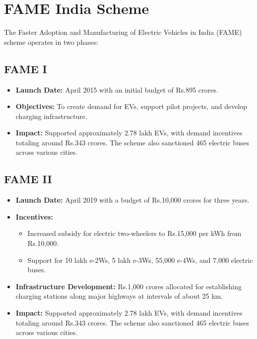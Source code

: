 \documentclass[a4paper,12pt]{report}
\begin{document}
\section{FAME India Scheme}
The Faster Adoption and Manufacturing of Electric Vehicles in India (FAME) scheme operates in two phases:
\subsection{FAME I}
\begin{itemize}
    \item \textbf{Launch Date:}
    April 2015 with an initial budget of Rs.895 crores. 
    
    \item \textbf{Objectives:}
    To create demand for EVs, support pilot projects, and develop charging infrastructure.

    \item \textbf{Impact:}
   Supported approximately 2.78 lakh EVs, with demand incentives totaling around Rs.343 crores. The scheme also sanctioned 465 electric buses across various cities.
\end{itemize} 

\subsection{FAME II}
\begin{itemize}
    \item \textbf{Launch Date:}
    April 2019 with a budget of Rs.10,000 crores for three years.
    
    \item \textbf{Incentives:}
    \begin{itemize}
        \item Increased subsidy for electric two-wheelers to Rs.15,000 per kWh from Rs.10,000.
        \item Support for 10 lakh e-2Ws, 5 lakh e-3Ws, 55,000 e-4Ws, and 7,000 electric buses.
    \end{itemize}

    \item \textbf{Infrastructure Development:}
    Rs.1,000 crores allocated for establishing charging stations along major highways at intervals of about 25 km.

    \item \textbf{Impact:}
    Supported approximately 2.78 lakh EVs, with demand incentives totaling around Rs.343 crores. The scheme also sanctioned 465 electric buses across various cities.
\end{itemize}
\end{document}
